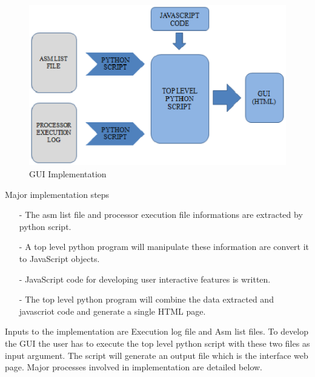\begin{figure}[H]
\centering
\includegraphics[width=5.5in]{./figures/GUI_impl.eps}
\caption{GUI Implementation} 
\label{fig:GUI_impl.eps}
\end{figure}

 Major implementation steps
\begin{itemize}
\item[-] The asm list file and processor execution file informations are extracted by python script.
\item[-] A top level python program will manipulate these information are convert it to JavaScript objects. 
\item[-] JavaScript code for developing user interactive features is written.
\item[-] The top level python program will combine the data extracted and javascriot code and generate a single HTML page. 
\end{itemize}
Inputs to the implementation are Execution log file and Asm list files. To develop the GUI the user has to execute the top level python script with these two files as input argument. The script will generate an output file which is the interface web page. Major processes involved in implementation are detailed below. 


